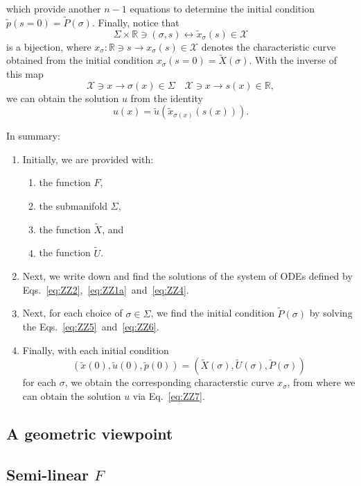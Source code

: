\documentclass[11pt,spanish]{article}
\newcommand{\RR}{\mathbb{R}}
\begin{document}
which provide another $n-1$ equations to determine the initial condition $\tilde p(s=0)=\tilde P(\sigma)$.
Finally, notice that
$$
\Sigma\times \RR \ni (\sigma,s) \leftrightarrow \tilde x_{\sigma}(s)\in \mathcal X
$$
is a bijection, where $x_{\sigma}:\RR\ni s\to x_{\sigma}(s)\in \mathcal X$ denotes the characteristic curve obtained from the initial condition $x_{\sigma}(s=0)=\tilde X(\sigma)$.
With the inverse of this map
$$
\mathcal X \ni x\to \sigma(x) \in \Sigma
\quad
\mathcal X \ni x\to s(x) \in \RR,
$$
we can obtain the solution $u$ from the identity
\begin{equation}
\label{eq:ZZ7}
u(x)
=
\tilde{u}(\tilde x_{\sigma(x)}(s(x)))
.
\end{equation}

In summary:
\begin{enumerate}
\item
Initially, we are provided with:
\begin{enumerate}
\item the function $F$,
\item the submanifold $\Sigma$,
\item the function $\tilde X$, and
\item the function $\tilde U$.
\end{enumerate}
\item 
Next, we write down and find the solutions of the system of ODEs defined by Eqs.~\ref{eq:ZZ2},~\ref{eq:ZZ1a}~and~\ref{eq:ZZ4}.
\item Next, for each choice of $\sigma\in \Sigma$, we find the initial condition $\tilde P(\sigma)$ by solving the Eqs.~\ref{eq:ZZ5}~and~\ref{eq:ZZ6}.
\item Finally, with each initial condition 
$$
(\tilde x(0),\tilde u(0),\tilde p(0))
=
(\tilde X(\sigma),\tilde U(\sigma),\tilde P(\sigma))
$$ 
for each $\sigma$, we obtain the corresponding characterstic curve $x_{\sigma}$, from where we can obtain the solution $u$ via Eq.~\ref{eq:ZZ7}.
\end{enumerate}

\subsection{A geometric viewpoint}


\subsection{Semi-linear $F$}
\end{document}
